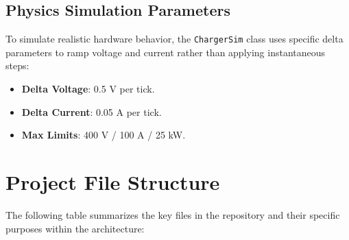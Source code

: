 \documentclass[a4paper,11pt]{report}
\begin{document}
\subsection{Physics Simulation Parameters}
To simulate realistic hardware behavior, the \texttt{ChargerSim} class uses specific delta parameters to ramp voltage and current rather than applying instantaneous steps:
\begin{itemize}
    \item \textbf{Delta Voltage}: 0.5 V per tick.
    \item \textbf{Delta Current}: 0.05 A per tick.
    \item \textbf{Max Limits}: 400 V / 100 A / 25 kW.
\end{itemize}

\section{Project File Structure}
The following table summarizes the key files in the repository and their specific purposes within the architecture:
\end{document}
